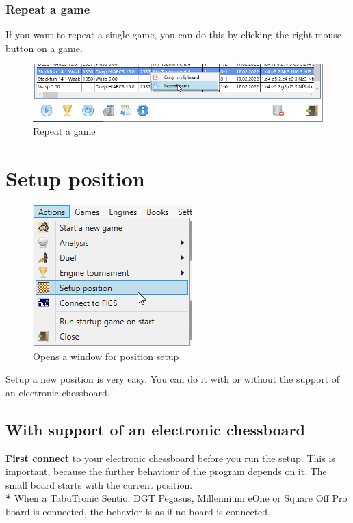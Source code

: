 \documentclass[11pt,a4paper]{article}
\begin{document}
\subsubsection{Repeat a game}
If you want to repeat a single game, you can do this by clicking the right mouse button on a game.

\begin{figure}[H]
	\centering
	\includegraphics[scale=0.6]{EngineTournament8.png}
	\caption{Repeat a game}
	\label{fig:EngineTournament8}
\end{figure}


\section{Setup position} \label{SetupPosition}

\begin{figure}[H]
	\centering
	\includegraphics[scale=1.0]{SetupPosition1.png}
	\caption{Opens a window for position setup}
	\label{fig:SetupPosition1}
\end{figure}

Setup a new position is very easy. You can do it with or without the support of an electronic chessboard.

\subsection{With support of an electronic chessboard}

\textbf{First connect} to your electronic chessboard before you run the setup. This is important, because the further behaviour of the program depends on it.
The small board starts with the current position.\\
\textbf{{\color{red}*}} When a TabuTronic Sentio, DGT Pegasus, Millennium eOne or Square Off Pro board is connected, the behavior is as if no board is connected.
\end{document}
